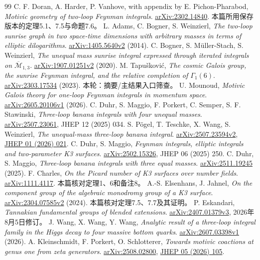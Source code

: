 \documentclass[11pt,a4paper]{ctexart}
\theoremstyle{cnplain}\newtheorem{proposition}{命题}[section]
\begin{document}
\begin{thebibliography}{99}\small
{} C. F. Doran, A. Harder, P. Vanhove, with appendix by E. Pichon-Pharabod,
\emph{Motivic geometry of two-loop Feynman integrals}.
\href{https://arxiv.org/abs/2302.14840}{arXiv:2302.14840}.
本篇所用保存版本的定理5.1、7.5与命题7.6。
 L. Adams, C. Bogner, S. Weinzierl,
\emph{The two-loop sunrise graph in two space-time dimensions with arbitrary masses in terms of elliptic dilogarithms}.
\href{https://arxiv.org/abs/1405.5640v2}{arXiv:1405.5640v2} (2014).
 C. Bogner, S. Müller-Stach, S. Weinzierl,
\emph{The unequal mass sunrise integral expressed through iterated integrals on
$\overline{\mathcal M}_{1,3}$}.
\href{https://arxiv.org/abs/1907.01251v2}{arXiv:1907.01251v2} (2020).
 M. Tapušković,
\emph{The cosmic Galois group, the sunrise Feynman integral, and the relative completion of $\Gamma_1(6)$}.
\href{https://arxiv.org/abs/2303.17534}{arXiv:2303.17534} (2023).
本轮：摘要/主结果入口筛查。
 U. Mounoud,
\emph{Motivic Galois theory for one-loop Feynman integrals in momentum space}.
\href{https://arxiv.org/abs/2605.20106v1}{arXiv:2605.20106v1} (2026).
 C. Duhr, S. Maggio, F. Porkert, C. Semper, S. F. Stawinski,
\emph{Three-loop banana integrals with four unequal masses}.
\href{https://arxiv.org/abs/2507.23061}{arXiv:2507.23061}, JHEP 12 (2025) 034.
 S. Pögel, T. Teschke, X. Wang, S. Weinzierl,
\emph{The unequal-mass three-loop banana integral}.
\href{https://arxiv.org/abs/2507.23594v2}{arXiv:2507.23594v2},
\href{https://doi.org/10.1007/JHEP01(2026)021}{JHEP 01 (2026) 021}.
 C. Duhr, S. Maggio,
\emph{Feynman integrals, elliptic integrals and two-parameter K3 surfaces}.
\href{https://arxiv.org/abs/2502.15326}{arXiv:2502.15326}, JHEP 06 (2025) 250.
 C. Duhr, S. Maggio,
\emph{Three-loop banana integrals with three equal masses}.
\href{https://arxiv.org/abs/2511.19245}{arXiv:2511.19245} (2025).
 F. Charles,
\emph{On the Picard number of K3 surfaces over number fields}.
\href{https://arxiv.org/abs/1111.4117}{arXiv:1111.4117}.
本篇核对定理1、6和备注8。
 A.-S. Elsenhans, J. Jahnel,
\emph{On the component group of the algebraic monodromy group of a K3 surface}.
\href{https://arxiv.org/abs/2304.07585v2}{arXiv:2304.07585v2} (2024).
本篇核对定理7.5、7.7及其证明。
 P. Eskandari,
\emph{Tannakian fundamental groups of blended extensions}.
\href{https://arxiv.org/abs/2407.01379v3}{arXiv:2407.01379v3}, 2026年8月5日修订。
 J. Wang, X. Wang, Y. Wang,
\emph{Analytic result of a three-loop integral family in the Higgs decay to four massive bottom quarks}.
\href{https://arxiv.org/abs/2607.03398v1}{arXiv:2607.03398v1} (2026).
 A. Kleinschmidt, F. Porkert, O. Schlotterer,
\emph{Towards motivic coactions at genus one from zeta generators}.
\href{https://arxiv.org/abs/2508.02800}{arXiv:2508.02800},
\href{https://doi.org/10.1007/JHEP05(2026)105}{JHEP 05 (2026) 105}.
\end{thebibliography}
\end{document}
